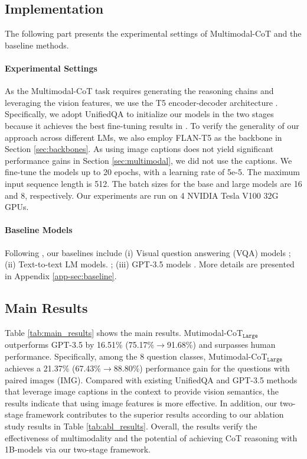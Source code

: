 \documentclass[nohyperref]{article}
\theoremstyle{plain}
\theoremstyle{definition}
\theoremstyle{remark}
\begin{document}
\subsection{Implementation}
The following part presents the experimental settings of Multimodal-CoT and the baseline methods.
\paragraph{Experimental Settings} As the Multimodal-CoT task requires generating the reasoning chains and leveraging the vision features, we use the T5 encoder-decoder architecture \citep{raffel2020exploring}. Specifically, we adopt UnifiedQA \citep{khashabi2020unifiedqa} to initialize our models in the two stages because it achieves the best fine-tuning results in \citet{lu2022learn}. To verify the generality of our approach across different LMs, we also employ FLAN-T5 \citep{chung2022scaling} as the backbone in Section \ref{sec:backbones}. As using image captions does not yield significant performance gains in Section \ref{sec:multimodal}, we did not use the captions. We fine-tune the models up to 20 epochs, with a learning rate of 5e-5. The maximum input sequence length is 512. The batch sizes for the base and large models are 16 and 8, respectively. Our experiments are run on 4 NVIDIA Tesla V100 32G GPUs. 

\paragraph{Baseline Models}
Following \citet{lu2022learn}, our baselines include (i) Visual question answering (VQA) models \citep{Anderson2017up,Kim2018,yu2019mcan,gao2019dynamic,pmlr-v139-kim21k,lu2021iconqa,li2019visualbert}; (ii) Text-to-text LM models. \citep{khashabi2020unifiedqa}; (iii) GPT-3.5 models \citep{chen2020big}. More details are presented in Appendix \ref{app-sec:baseline}.

\subsection{Main Results}
Table \ref{tab:main_results} shows the main results. Mutimodal-CoT$_\texttt{Large}$ outperforms GPT-3.5 by 16.51\% (75.17\%$\rightarrow$91.68\%) and surpasses human performance. Specifically, among the 8 question classes, Mutimodal-CoT$_\texttt{Large}$ achieves a 21.37\% (67.43\%$\rightarrow$88.80\%) performance gain for the questions with paired images (IMG). Compared with existing UnifiedQA and GPT-3.5 methods that leverage image captions in the context to provide vision semantics, the results indicate that using image features is more effective. In addition, our two-stage framework contributes to the superior results according to our ablation study results in Table \ref{tab:abl_results}. Overall, the results verify the effectiveness of multimodality and the potential of achieving CoT reasoning with 1B-models via our two-stage framework. 
\end{document}

